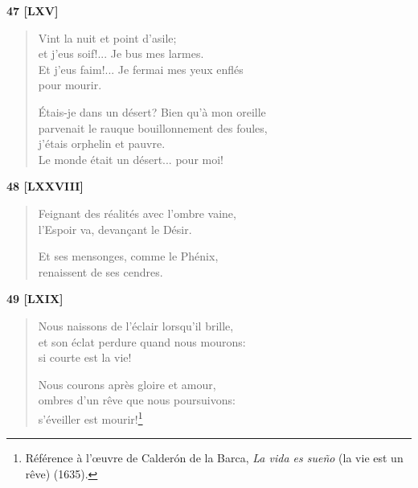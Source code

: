 \bigskip

\begin{center}
  \textbf{47 [LXV]}
\end{center}

\begin{verse}
  Vint la nuit et point d'asile; \\
  et j'eus soif!... Je bus mes larmes. \\
  Et j'eus faim!... Je fermai mes yeux enflés \\
  pour mourir.

  Étais-je dans un désert? Bien qu'à mon oreille \\
  parvenait le rauque bouillonnement des foules,\hspace*{-10pt} \\
  j'étais orphelin et pauvre. \\
  Le monde était un désert... pour moi!
\end{verse}

\bigskip

\begin{center}
  \textbf{48 [LXXVIII]}
\end{center}

\begin{verse}
  Feignant des réalités avec l'ombre vaine, \\
  l'Espoir va, devançant le Désir.

  Et ses mensonges,
  comme le Phénix, \\
  renaissent de ses cendres.
\end{verse}

\pagebreak

\begin{center}
  \textbf{49 [LXIX]}
\end{center}

\begin{verse}
  Nous naissons de l'éclair lorsqu'il brille, \\
  et son éclat perdure quand nous mourons: \\
  si courte est la vie!

  Nous courons après gloire et amour, \\
  ombres d'un rêve que nous poursuivons: \\
  s'éveiller est mourir!\footnote{Référence à l'œuvre de Calderón de
  la Barca, \emph{La vida es sueño} (la vie est un rêve) (1635).}
\end{verse}

